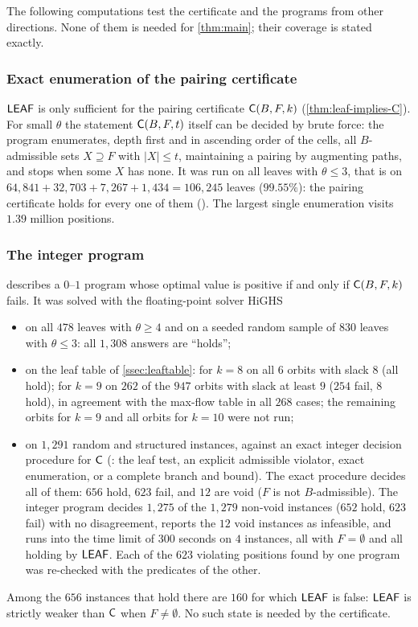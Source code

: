 The following computations test the certificate and the programs from other directions. None of them is
needed for \cref{thm:main}; their coverage is stated exactly.

\subsubsection*{Exact enumeration of the pairing certificate}
$\mathsf{LEAF}$ is only sufficient for the pairing certificate $\mathsf{C}(B,F,k)$ (\cref{thm:leaf-implies-C}). For small
$\theta$ the statement $\mathsf{C}(B,F,t)$ itself can be decided by brute force: the program 
enumerates, depth first and in ascending order of the cells, all $B$-admissible sets $X\supseteq F$ with
$|X|\le t$, maintaining a pairing by augmenting paths, and stops when some $X$ has none. It was run on all
leaves with $\theta\le3$, that is on $64{,}841+32{,}703+7{,}267+1{,}434=106{,}245$ leaves ($99.55\%$): the
pairing certificate holds for every one of them (). The
largest single enumeration visits $1.39$ million positions.

\subsubsection*{The integer program}
 describes a $0$--$1$ program whose optimal value is positive if and only if $\mathsf{C}(B,F,k)$
fails. It was solved with the floating-point solver HiGHS~\cite{HuangfuHall2018}
\begin{itemize}[leftmargin=1.6em]
\item on all $478$ leaves with $\theta\ge4$ and on a seeded random sample of $830$ leaves with
  $\theta\le 3$: all $1{,}308$ answers are ``holds'';
\item on the leaf table of \cref{ssec:leaftable}: for $k=8$ on all $6$ orbits with slack $8$ (all hold); for
  $k=9$ on $262$ of the $947$ orbits with slack at least $9$ ($254$ fail, $8$ hold), in agreement with the
  max-flow table in all $268$ cases; the remaining orbits for $k=9$ and all orbits for $k=10$ were not run;
\item on $1{,}291$ random and structured instances, against an exact integer decision procedure for $\mathsf{C}$
  (: the leaf test, an explicit admissible violator, exact enumeration, or a complete branch
  and bound). The exact procedure decides all of them: $656$ hold, $623$ fail, and $12$ are void ($F$ is not
  $B$-admissible). The integer program decides $1{,}275$ of the $1{,}279$ non-void instances ($652$ hold,
  $623$ fail) with no disagreement, reports the $12$ void instances as infeasible, and runs into the time
  limit of $300$ seconds on $4$ instances, all with $F=\emptyset$ and all holding by $\mathsf{LEAF}$. Each of the
  $623$ violating positions found by one program was re-checked with the predicates of the other.
\end{itemize}
Among the $656$ instances that hold there are $160$ for which $\mathsf{LEAF}$ is false: $\mathsf{LEAF}$ is strictly
weaker than $\mathsf{C}$ when $F\neq\emptyset$. No such state is needed by the certificate.


